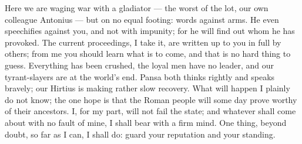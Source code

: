 

 Here we are waging war with a gladiator --- the worst of the lot, our own colleague Antonius --- but on no equal footing: words against arms. He even speechifies against you, and not with impunity; for he will find out whom he has provoked. The current proceedings, I take it, are written up to you in full by others; from me you should learn what is to come, and that is no hard thing to guess. Everything has been crushed, the loyal men have no leader, and our tyrant-slayers are at the world's end. Pansa both thinks rightly and speaks bravely; our Hirtius is making rather slow recovery. What will happen I plainly do not know; the one hope is that the Roman people will some day prove worthy of their ancestors. I, for my part, will not fail the state; and whatever shall come about with no fault of mine, I shall bear with a firm mind. One thing, beyond doubt, so far as I can, I shall do: guard your reputation and your standing.
